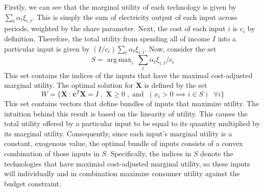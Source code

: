 \documentclass[11pt,a4paper,leqno]{extarticle}
\DeclareMathOperator*{\argmax}{arg\,max}
\begin{document}
	Firstly, we can see that the marginal utility of each technology is given by $\sum_t \alpha_t \xi_{i,t}$. This is simply the sum of electricity output of each input across periods, weighted by the share parameter. Next, the cost of each input $i$ is $c_i$ by definition. Therefore, the total utility from spending all of income $I$ into a particular input is given by $(I/c_i) \sum_t \alpha_t \xi_{i,t}$. Now, consider the set 
	$$S = \argmax_i \, \sum_t \alpha_t \xi_{i,t}/c_i$$
	This set contains the indices of the inputs that have the maximal cost-adjusted marginal utility. 
	The optimal solution for $\mathbf{X}$ is defined by the set 
	$$
	W =
	\{ \mathbf{X} \, : \, \mathbf{c}^T \mathbf{X} = I \;,\;  \mathbf{X} \geq 0 \;,\; \text{and} \;\;  (x_i > 0 \implies i \in S) \;\; \forall i \}
	$$
	This set contains vectors that define bundles of inputs that maximize utility. The intuition behind this result is based on the linearity of utility. This causes the total utility offered by a particular input to be equal to its quantity multiplied by its marginal utility. Consequently, since each input's marginal utility is a constant, exogenous value, the optimal bundle of inputs consists of a convex combination of those inputs in $S$. Specifically, the indices in $S$ denote the technologies that have maximial cost-adjusted marginal utility, so these inputs  will individually and in combination maximize consumer utility against the budget constraint. 	
	
\end{document}
